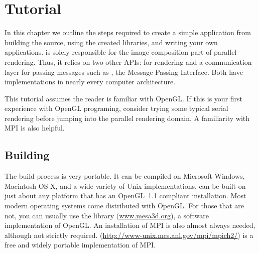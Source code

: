 
\chapter{Tutorial}
\label{chap:Tutorial}

In this chapter we outline the steps required to create a simple \IceT
application from building the \IceT source, using the created libraries,
and writing your own applications.  \IceT is solely responsible for the
image composition part of parallel rendering.  Thus, it relies on two other
APIs:  for rendering and a communication
layer for passing messages such as , the Message
Passing Interface.  Both have implementations in nearly every computer
architecture.

This tutorial assumes the reader is familiar with OpenGL.  If this is your
first experience with OpenGL programing, consider trying some typical
serial rendering before jumping into the parallel rendering domain.  A
familiarity with MPI is also helpful.

\section{Building \IceT}
\label{sec:Tutorial:Building_IceT}

The \IceT build process is very portable.  It can be compiled on Microsoft
Windows, Macintosh OS X, and a wide variety of Unix implementations.  \IceT
can be built on just about any platform that has an
OpenGL~1.1 compliant installation.  Most modern operating
systems come distributed with OpenGL.  For those that are not, you can
usually use the  library
(\href{www.mesa3d.org}{www.mesa3d.org}), a software implementation of
OpenGL.  An installation of MPI is also almost always needed, although not
strictly required.  
(\href{http://www-unix.mcs.anl.gov/mpi/mpich2/}{http://www-unix.mcs.anl.gov/mpi/mpich2/})
is a free and widely portable implementation of MPI.


